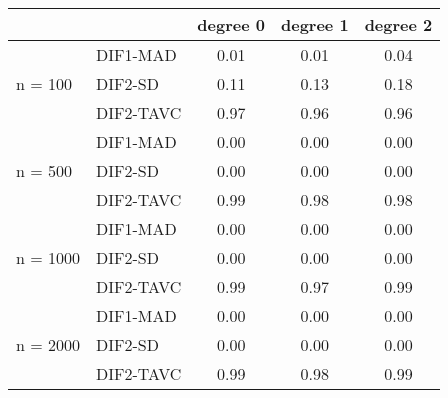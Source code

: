\begin{tabular}{|l|l|c|c|c|}
  \hline
 &  & degree 0 & degree 1 & degree 2 \\ 
  \hline
 & DIF1-MAD & 0.01 & 0.01 & 0.04 \\ 
  n = 100 & DIF2-SD & 0.11 & 0.13 & 0.18 \\ 
   & DIF2-TAVC & 0.97 & 0.96 & 0.96 \\ 
   & DIF1-MAD & 0.00 & 0.00 & 0.00 \\ 
  n = 500 & DIF2-SD & 0.00 & 0.00 & 0.00 \\ 
   & DIF2-TAVC & 0.99 & 0.98 & 0.98 \\ 
   & DIF1-MAD & 0.00 & 0.00 & 0.00 \\ 
  n = 1000 & DIF2-SD & 0.00 & 0.00 & 0.00 \\ 
   & DIF2-TAVC & 0.99 & 0.97 & 0.99 \\ 
   & DIF1-MAD & 0.00 & 0.00 & 0.00 \\ 
  n = 2000 & DIF2-SD & 0.00 & 0.00 & 0.00 \\ 
   & DIF2-TAVC & 0.99 & 0.98 & 0.99 \\ 
   \hline
\end{tabular}

